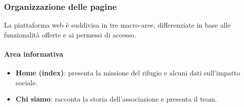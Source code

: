 \documentclass[10pt, letterpaper]{article}
\begin{document}
\subsubsection{Organizzazione delle pagine}
La piattaforma web è suddivisa in tre macro-aree, differenziate in base alle funzionalità offerte e ai permessi di accesso.

\paragraph{Area informativa}
\begin{itemize}
    \item \textbf{Home (index)}: presenta la missione del rifugio e alcuni dati sull’impatto sociale.
    \item \textbf{Chi siamo}: racconta la storia dell’associazione e presenta il team.
\end{itemize}
\end{document}
